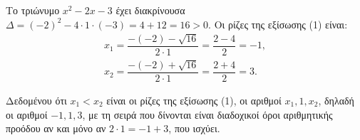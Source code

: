 
\begin{alist}
\item Το τριώνυμο $x^2 - 2x - 3$ έχει διακρίνουσα $\Delta = (-2)^2 - 4 \cdot 1 \cdot (-3) = 4 + 12 = 16 > 0$. Οι ρίζες
της εξίσωσης (1) είναι:
\begin{gather*}
x_1 = \dfrac{-(-2) - \sqrt{16}}{2 \cdot 1} = \dfrac{2 - 4}{2} = -1, \\
x_2 = \dfrac{-(-2) + \sqrt{16}}{2 \cdot 1} = \dfrac{2 + 4}{2} = 3.
\end{gather*}

\item Δεδομένου ότι $x_1 < x_2$ είναι οι ρίζες της εξίσωσης (1), οι αριθμοί $x_1, 1, x_2$, δηλαδή οι αριθμοί
$-1, 1, 3$, με τη σειρά που δίνονται είναι διαδοχικοί όροι αριθμητικής προόδου αν και μόνο αν
$2 \cdot 1 = -1 + 3$, που ισχύει.
\end{alist}

